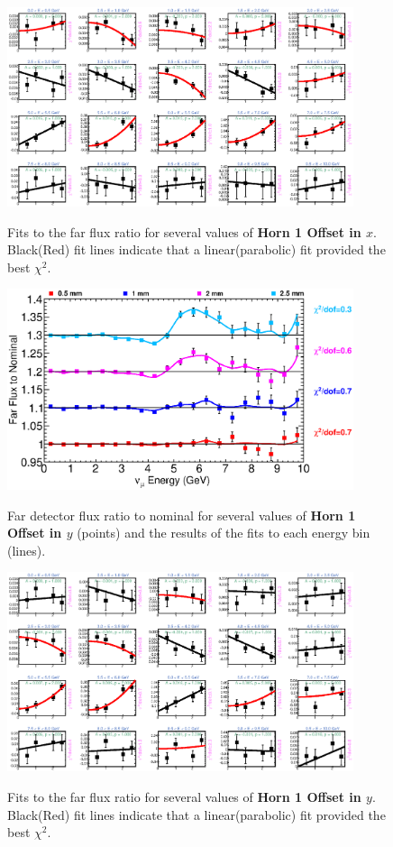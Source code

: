 \begin{figure}[hb]
  \begin{center}
    {\includegraphics[width=4.0in]{figures/Horn1XOffset_far_fits.eps}}
  \end{center}
\caption{ Fits to the far flux ratio for several values of {\bf Horn 1 Offset in $x$}. Black(Red) fit lines indicate that a linear(parabolic) fit provided the best $\chi^2$. }
\end{figure}

\begin{figure}[ht]
  \begin{center}
    {\includegraphics[width=4.0in]{figures/Horn1YOffset_far_summary.eps}}
  \end{center}
\caption{ Far detector flux ratio to nominal for several values of {\bf Horn 1 Offset in $y$} (points) and the results of the fits to each energy bin (lines).}
\end{figure}

\begin{figure}[hb]
  \begin{center}
    {\includegraphics[width=4.0in]{figures/Horn1YOffset_far_fits.eps}}
  \end{center}
\caption{ Fits to the far flux ratio for several values of {\bf Horn 1 Offset in $y$}. Black(Red) fit lines indicate that a linear(parabolic) fit provided the best $\chi^2$. }
\end{figure}

